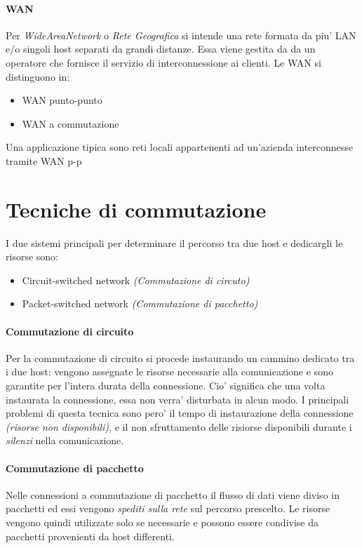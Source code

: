\paragraph{WAN}
Per \textit{WideAreaNetwork} o \textit{Rete Geografica} si intende una rete formata da piu' LAN e/o singoli host separati da grandi distanze.
Essa viene gestita da da un operatore che fornisce il servizio di interconnessione ai clienti.\newline
Le WAN si distinguono in: 
\begin{itemize}
    \item WAN punto-punto
    \item WAN a commutazione
\end{itemize}
Una applicazione tipica sono reti locali appartenenti ad un'azienda interconnesse tramite WAN p-p
\section{Tecniche di commutazione}
I due sistemi principali per determinare il percorso tra due host e dedicargli le risorse sono:
\begin{itemize}
    \item Circuit-switched network \textit{(Commutazione di circuto)}
    \item Packet-switched network \textit{(Commutazione di pacchetto)}
\end{itemize}
\paragraph{Commutazione di circuito}
Per la commutazione di circuito si procede instaurando un cammino dedicato tra i due host: vengono assegnate le risorse necessarie alla comunicazione e sono garantite per l'intera durata della connessione.
Cio' significa che una volta instaurata la connessione, essa non verra' disturbata in alcun modo.\newline
I principali problemi di questa tecnica sono pero' il tempo di instaurazione della connessione \textit{(risorse non disponibili)}, e il non sfruttamento delle risiorse disponibili durante i \textit{silenzi} nella comunicazione.
\paragraph{Commutazione di pacchetto}
Nelle connessioni a commutazione di pacchetto il flusso di dati viene diviso in pacchetti ed essi vengono \textit{spediti sulla rete} sul percorso prescelto.
Le risorse vengono quindi utilizzate solo se necessarie e possono essere condivise da pacchetti provenienti da host differenti.

